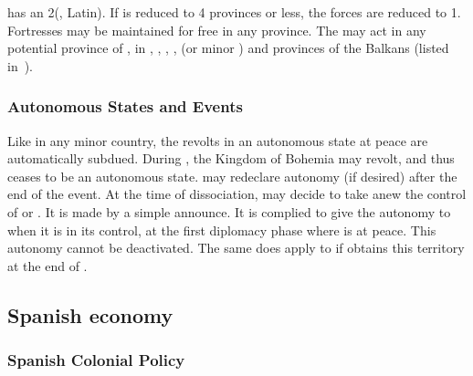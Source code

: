 \aparag {} has an 2\ARMY\faceplus (\CAIIM, Latin).
\bparag If  is reduced to 4 provinces or less, the forces
are reduced to 1\ARMY\faceplus.
\bparag Fortresses may be maintained for free in any province.
\bparag The \ARMY may act in any potential province of ,
in , , ,
,  (or minor ) and
provinces of the Balkans (listed in~).


\subsubsection{Autonomous States and Events}
\aparag Like in any minor country, the revolts in an autonomous state at
peace are automatically subdued.
\aparag During , the Kingdom of Bohemia
may revolt, and thus  ceases to be an autonomous
state. \AUS may redeclare autonomy (if desired) after the end of the
event.
\aparag At the time of dissociation, \HAB may decide to take anew the
control of  or . It is made by a simple
announce. It is complied to give the autonomy to  when it
is in its control, at the first diplomacy phase where \AUS is at
peace. This autonomy cannot be deactivated.
\bparag The same does apply to  if \AUS obtains this
territory at the end of .



\subsection{Spanish economy}


\subsubsection{Spanish Colonial Policy}

